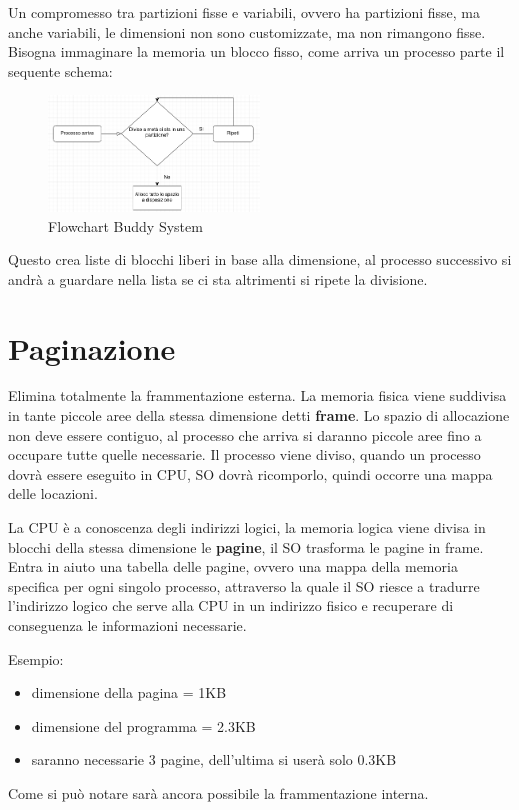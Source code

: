 \documentclass[a4paper, 12pt]{book}
\begin{document}
Un compromesso tra partizioni fisse e variabili, ovvero
ha partizioni fisse, ma anche variabili, le dimensioni 
non sono customizzate, ma non rimangono fisse. Bisogna 
immaginare la memoria un blocco fisso, come arriva un
processo parte il sequente schema:  

\begin{figure}
    \includegraphics[width=0.5\textwidth]{buddy_system.png}
    \caption{Flowchart Buddy System}
\end{figure}

Questo crea liste di blocchi liberi in base alla dimensione,
al processo successivo si andrà a guardare nella lista
se ci sta altrimenti si ripete la divisione.

\section{Paginazione}

Elimina totalmente la frammentazione esterna. La memoria fisica
viene suddivisa in tante piccole aree della stessa dimensione detti \textbf{frame}.
Lo spazio di allocazione non deve essere contiguo, al processo 
che arriva si daranno piccole aree fino a occupare tutte 
quelle necessarie. Il processo viene diviso,
quando un processo dovrà essere eseguito in CPU, SO dovrà
ricomporlo, quindi occorre una mappa delle locazioni.

La CPU è a conoscenza degli indirizzi logici, la memoria
logica viene divisa in blocchi della stessa dimensione le \textbf{pagine}, il SO 
trasforma le pagine in frame.
Entra in aiuto una tabella delle pagine, ovvero una mappa
della memoria specifica per ogni singolo processo, attraverso
la quale il SO riesce a tradurre l'indirizzo logico che serve alla 
CPU in un indirizzo fisico e recuperare di conseguenza le 
informazioni necessarie.

Esempio:
\begin{itemize}
    \item dimensione della pagina = 1KB
    \item dimensione del programma = 2.3KB
    \item saranno necessarie 3 pagine, dell'ultima si userà solo 0.3KB
\end{itemize}
Come si può notare sarà ancora possibile la frammentazione
interna.
\end{document}
